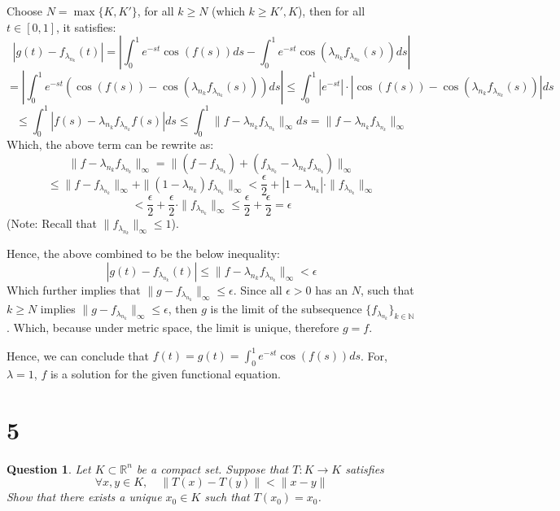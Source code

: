 \documentclass{article}
\newtheorem{question}{Question}
\begin{document}
Choose $N=\max\{K,K'\}$, for all $k\geq N$ (which $k\geq K',K$), then for all $t\in [0,1]$, it satisfies:
$$|g(t)-f_{\lambda_{n_k}}(t)| = \left|\int_{0}^{1}e^{-st}\cos(f(s))ds - \int_{0}^{1}e^{-st}\cos(\lambda_{n_k}f_{\lambda_{n_k}}(s))ds\right|$$
$$= \left|\int_{0}^{1}e^{-st}(\cos(f(s))-\cos(\lambda_{n_k}f_{\lambda_{n_k}}(s)))ds\right|\leq \int_{0}^{1}|e^{-st}|\cdot |\cos(f(s))-\cos(\lambda_{n_k}f_{\lambda_{n_k}}(s))|ds$$
$$\leq \int_{0}^{1}|f(s)-\lambda_{n_k}f_{\lambda_{n_k}}f(s)|ds \leq \int_{0}^{1}\|f-\lambda_{n_k}f_{\lambda_{n_k}}\|_\infty ds = \|f-\lambda_{n_k}f_{\lambda_{n_k}}\|_\infty$$
Which, the above term can be rewrite as:
$$\|f-\lambda_{n_k}f_{\lambda_{n_k}}\|_\infty = \|(f-f_{\lambda_{n_k}})+(f_{\lambda_{n_k}}-\lambda_{n_k}f_{\lambda_{n_k}})\|_\infty$$
$$\leq \|f-f_{\lambda_{n_k}}\|_\infty +\|(1-\lambda_{n_k})f_{\lambda_{n_k}}\|_\infty < \frac{\epsilon}{2}+|1-\lambda_{n_k}|\cdot \|f_{\lambda_{n_k}}\|_\infty$$
$$ < \frac{\epsilon}{2} + \frac{\epsilon}{2}\cdot \|f_{\lambda_{n_k}}\|_\infty \leq \frac{\epsilon}{2}+\frac{\epsilon}{2}=\epsilon$$
(Note: Recall that $\|f_{\lambda_{n_k}}\|_\infty \leq 1$).

Hence, the above combined to be the below inequality:
$$|g(t)-f_{\lambda_{n_k}}(t)| \leq \|f-\lambda_{n_k}f_{\lambda_{n_k}}\|_\infty < \epsilon$$
Which further implies that $\|g-f_{\lambda_{n_k}}\|_\infty \leq \epsilon$. Since all $\epsilon>0$ has an $N$, such that $k\geq N$ implies $\|g-f_{\lambda_{n_k}}\|_\infty \leq \epsilon$,
then $g$ is the limit of the subsequence $\{f_{\lambda_{n_k}}\}_{k\in\mathbb{N}}$. Which, because under metric space, the limit is unique, therefore $g=f$.

Hence, we can conclude that $f(t)=g(t)=\int_{0}^{1}e^{-st}\cos(f(s))ds$. For, $\lambda=1$, $f$ is a solution for the given functional equation.

\hfil

\hfil

\section*{5}
\begin{myBox}[]{}
    \begin{question}
        Let $K\subset \mathbb{R}^n$ be a compact set. Suppose that $T:K\rightarrow K$ satisfies
        $$\forall x,y\in K,\quad \|T(x)-T(y)\|<\|x-y\|$$
        Show that there exists a unique $x_0\in K$ such that $T(x_0)=x_0$.
    \end{question}
\end{myBox}
\end{document}
